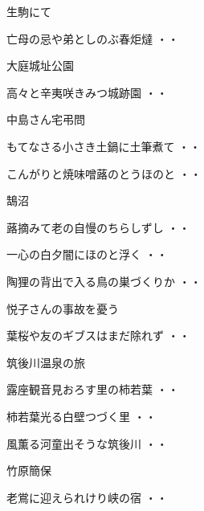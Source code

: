 生駒にて
\begin{shiika}亡母の忌や弟としのぶ春炬燵
\hfill{・・}\end{shiika}
\vspace{0.6cm}
大庭城址公園
\begin{shiika}高々と辛夷咲きみつ城跡園
\hfill{・・}\end{shiika}
\vspace{0.6cm}
中島さん宅弔問
\begin{shiika}もてなさる小さき土鍋に土筆煮て
\hfill{・・}\end{shiika}
\begin{shiika}こんがりと焼味噌蕗のとうほのと
\hfill{・・}\end{shiika}
\vspace{0.6cm}
鵠沼
\begin{shiika}蕗摘みて老の自慢のちらしずし
\hfill{・・}\end{shiika}
\begin{shiika}一心の白夕闇にほのと浮く
\hfill{・・}\end{shiika}
\begin{shiika}陶狸の背出で入る鳥の巣づくりか
\hfill{・・}\end{shiika}
\vspace{0.6cm}
悦子さんの事故を憂う
\begin{shiika}葉桜や友のギブスはまだ除れず
\hfill{・・}\end{shiika}
\vspace{0.6cm}
筑後川温泉の旅
\begin{shiika}露座観音見おろす里の柿若葉
\hfill{・・}\end{shiika}
\begin{shiika}柿若葉光る白壁つづく里
\hfill{・・}\end{shiika}
\begin{shiika}風薫る河童出そうな筑後川
\hfill{・・}\end{shiika}
\vspace{0.6cm}
竹原簡保
\begin{shiika}老鴬に迎えられけり峡の宿
\hfill{・・}\end{shiika}
